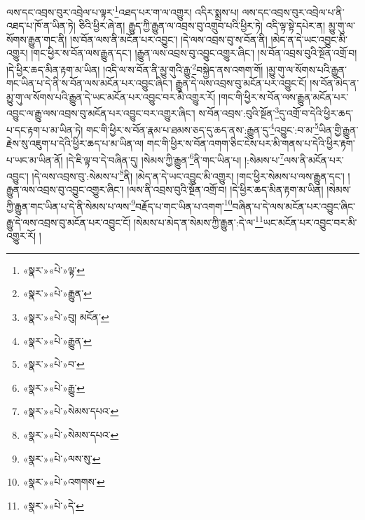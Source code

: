 ལས་དང་འབྲས་བུར་འབྲེལ་པ་ལྟར་\footnote{«སྣར་»«པེ་»ལྟ་}འཐད་པར་ག་ལ་འགྱུར། འདིར་སྨྲས་པ། ལས་དང་འབྲས་བུར་འབྲེལ་པ་ནི་འཐད་པ་ཁོ་ན་ཡིན་ཏེ། ཅིའི་ཕྱིར་ཞེ་ན། རྒྱུད་ཀྱི་རྒྱུན་ལ་འབྲས་བུ་འགྲུབ་པའི་ཕྱིར་ཏེ། འདི་ལྟ་སྟེ་དཔེར་ན། མྱུ་གུ་ལ་སོགས་རྒྱུན་གང་ནི། །ས་བོན་ལས་ནི་མངོན་པར་འབྱུང་། །དེ་ལས་འབྲས་བུ་ས་བོན་ནི། །མེད་ན་དེ་ཡང་འབྱུང་མི་འགྱུར། །གང་ཕྱིར་ས་བོན་ལས་རྒྱུན་དང་། །རྒྱུན་ལས་འབྲས་བུ་འབྱུང་འགྱུར་ཞིང་། །ས་བོན་འབྲས་བུའི་སྔོན་འགྲོ་བ། །དེ་ཕྱིར་ཆད་མིན་རྟག་མ་ཡིན། །འདི་ལ་ས་བོན་ནི་མྱུ་གུའི་རྒྱུ་\footnote{«སྣར་»«པེ་»རྒྱུན་}བསྐྱེད་ནས་འགག་གོ། །མྱུ་གུ་ལ་སོགས་པའི་རྒྱུན་གང་ཡིན་པ་དེ་ནི་ས་བོན་ལས་མངོན་པར་འབྱུང་ཞིང་། རྒྱུན་དེ་ལས་འབྲས་བུ་མངོན་པར་འབྱུང་ངོ། །ས་བོན་མེད་ན་མྱུ་གུ་ལ་སོགས་པའི་རྒྱུན་དེ་ཡང་མངོན་པར་འབྱུང་བར་མི་འགྱུར་རོ། །གང་གི་ཕྱིར་ས་བོན་ལས་རྒྱུན་མངོན་པར་འབྱུང་ལ་རྒྱུ་ལས་འབྲས་བུ་མངོན་པར་འབྱུང་བར་འགྱུར་ཞིང་། ས་བོན་འབྲས་:བུའི་སྔོན་\footnote{«སྣར་»«པེ་»བུ། མངོན་}དུ་འགྲོ་བ་དེའི་ཕྱིར་ཆད་པ་དང་རྟག་པ་མ་ཡིན་ཏེ། གང་གི་ཕྱིར་ས་བོན་རྣམ་པ་ཐམས་ཅད་དུ་ཆད་ནས་:རྒྱུན་དུ་\footnote{«སྣར་»«པེ་»རྒྱུན་}འབྱུང་:བ་མ་\footnote{«སྣར་»«པེ་»བ་}ཡིན་གྱི་རྒྱུན་རྗེས་སུ་འཇུག་པ་དེའི་ཕྱིར་ཆད་པ་མ་ཡིན་ལ། གང་གི་ཕྱིར་ས་བོན་འགག་ཅིང་ངེས་པར་མི་གནས་པ་དེའི་ཕྱིར་རྟག་པ་ཡང་མ་ཡིན་ནོ། །དེ་ཇི་ལྟ་བ་དེ་བཞིན་དུ། །སེམས་ཀྱི་རྒྱུན་\footnote{«སྣར་»«པེ་»རྒྱུ་}ནི་གང་ཡིན་པ། །:སེམས་པ་\footnote{«སྣར་»«པེ་»སེམས་དཔའ་}ལས་ནི་མངོན་པར་འབྱུང་། །དེ་ལས་འབྲས་བུ་:སེམས་པ་\footnote{«སྣར་»«པེ་»སེམས་དཔའ་}ནི། །མེད་ན་དེ་ཡང་འབྱུང་མི་འགྱུར། །གང་ཕྱིར་སེམས་པ་ལས་རྒྱུན་དང་། །རྒྱུན་ལས་འབྲས་བུ་འབྱུང་འགྱུར་ཞིང་། །ལས་ནི་འབྲས་བུའི་སྔོན་འགྲོ་བ། །དེ་ཕྱིར་ཆད་མིན་རྟག་མ་ཡིན། །སེམས་ཀྱི་རྒྱུན་གང་ཡིན་པ་དེ་ནི་སེམས་པ་ལས་\footnote{«སྣར་»«པེ་»ལས་སུ་}བརྗོད་པ་གང་ཡིན་པ་འགག་\footnote{«སྣར་»«པེ་»འགགས་}བཞིན་པ་དེ་ལས་མངོན་པར་འབྱུང་ཞིང་རྒྱུ་དེ་ལས་འབྲས་བུ་མངོན་པར་འབྱུང་ངོ། །སེམས་པ་མེད་ན་སེམས་ཀྱི་རྒྱུན་:དེ་ལ་\footnote{«སྣར་»«པེ་»དེ་}ཡང་མངོན་པར་འབྱུང་བར་མི་འགྱུར་རོ། །
